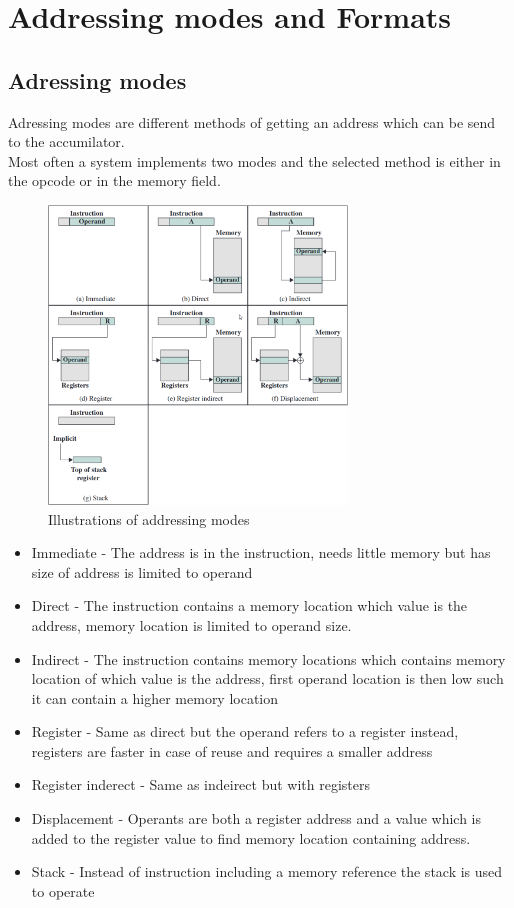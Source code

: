 \documentclass[12pt, a4paper]{article}
\begin{document}
	\section{Addressing modes and Formats}
		\subsection{Adressing modes}
			Adressing modes are different methods of getting an address which can be send to the accumilator.\\
			Most often a system implements two modes and the selected method is either in the opcode or in the memory field.\\
			\begin{figure}[h!]
				\centering
				\includegraphics[width=300px]{assets/addressingModes.png}
				\caption{Illustrations of addressing modes}
			\end{figure}
			\begin{itemize}
				\item Immediate - The address is in the instruction, needs little memory but has size of address is limited to operand
				\item Direct - The instruction contains a memory location which value is the address, memory location is limited to operand size.
				\item Indirect - The instruction contains memory locations which contains memory location of which value is the address, first operand location is then low such it can contain a higher memory location
				\item Register - Same as direct but the operand refers to a register instead, registers are faster in case of reuse and requires a smaller address
				\item Register inderect - Same as indeirect but with registers
				\item Displacement - Operants are both a register address and a value which is added to the register value to find memory location containing address.
				\item Stack - Instead of instruction including a memory reference the stack is used to operate
			\end{itemize}
\end{document}
